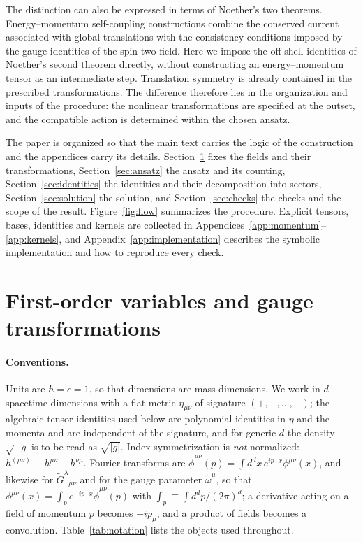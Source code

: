 \documentclass[prd,aps,preprint,superscriptaddress,nofootinbib,amsmath,amssymb,eqsecnum]{revtex4-2}
\newcommand{\tomega}{\tilde{\omega}}
\newcommand{\p}{\tilde{\phi}}
\newcommand{\G}{\tilde{G}}
\newcommand{\ip}[1]{\int_{#1}}
\begin{document}
The distinction can also be expressed in terms of Noether's two theorems. Energy--momentum
self-coupling constructions combine the conserved current associated with global translations
with the consistency conditions imposed by the gauge identities of the spin-two field. Here
we impose the off-shell identities of Noether's second theorem directly, without constructing
an energy--momentum tensor as an intermediate step. Translation symmetry is already contained
in the prescribed transformations. The difference therefore lies in the organization and
inputs of the procedure: the nonlinear transformations are specified at the outset,
and the compatible action is determined within the chosen ansatz.

The paper is organized so that the main text carries the logic of the construction and the
appendices carry its details. Section~\ref{sec:variables} fixes the fields and their
transformations, Section~\ref{sec:ansatz} the ansatz and its counting, Section~\ref{sec:identities}
the identities and their decomposition into sectors, Section~\ref{sec:solution} the solution,
and Section~\ref{sec:checks} the checks and the scope of the result. Figure~\ref{fig:flow}
summarizes the procedure. Explicit tensors, bases, identities and kernels are collected in
Appendices~\ref{app:momentum}--\ref{app:kernels}, and Appendix~\ref{app:implementation}
describes the symbolic implementation and how to reproduce every check.

\section{First-order variables and gauge transformations}
\label{sec:variables}

\paragraph{Conventions.} Units are $\hbar=c=1$, so that dimensions are mass dimensions. We
work in $d$ spacetime dimensions with a flat metric $\eta_{\mu\nu}$ of signature
$(+,-,\dots,-)$; the algebraic tensor identities used below are polynomial identities in
$\eta$ and the momenta and are independent of the signature, and for generic $d$ the density
$\sqrt{-g}$ is to be read as $\sqrt{|g|}$. Index symmetrization is \emph{not} normalized:
$h^{(\mu\nu)}\equiv h^{\mu\nu}+h^{\nu\mu}$. Fourier transforms are
$\p^{\mu\nu}(p)=\int d^dx\,e^{ip\cdot x}\phi^{\mu\nu}(x)$, and likewise for
$\G^{\lambda}{}_{\mu\nu}$ and for the gauge parameter $\tomega^\mu$, so that
$\phi^{\mu\nu}(x)=\ip{p}e^{-ip\cdot x}\p^{\mu\nu}(p)$ with $\ip{p}\equiv\int d^dp/(2\pi)^d$;
a derivative acting on a field of momentum $p$ becomes $-ip_\mu$, and a product of fields
becomes a convolution. Table~\ref{tab:notation} lists the objects used throughout.
\end{document}
